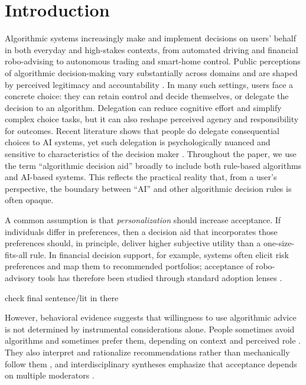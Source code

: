 \documentclass[a4paper, 12pt, fleqn]{article}
\theoremstyle{definition}
\begin{document}
\section{Introduction}\label{sec:intro}
Algorithmic systems increasingly make and implement decisions on users’ behalf in both everyday and high-stakes contexts, from automated driving and financial robo-advising to autonomous trading and smart-home control. Public perceptions of algorithmic decision-making vary substantially across domains and are shaped by perceived legitimacy and accountability \citep{Aysolmaz2023}. In many such settings, users face a concrete choice: they can retain control and decide themselves, or delegate the decision to an algorithm. Delegation can reduce cognitive effort and simplify complex choice tasks, but it can also reshape perceived agency and responsibility for outcomes. Recent literature shows that people do delegate consequential choices to AI systems, yet such delegation is psychologically nuanced and sensitive to characteristics of the decision maker \citep{Candrian2022}. Throughout the paper, we use the term ``algorithmic decision aid'' broadly to include both rule-based algorithms and AI-based systems. This reflects the practical reality that, from a user's perspective, the boundary between ``AI'' and other algorithmic decision rules is often opaque.

A common assumption is that \emph{personalization} should increase acceptance. If individuals differ in preferences, then a decision aid that incorporates those preferences should, in principle, deliver higher subjective utility than a one-size-fits-all rule. In financial decision support, for example, systems often elicit risk preferences and map them to recommended portfolios; acceptance of robo-advisory tools has therefore been studied through standard adoption lenses \citep{Figa-Talamanca2022,Mahmud2025}.
\begin{icomm}
	 check final sentence/lit in there
\end{icomm}

However, behavioral evidence suggests that willingness to use algorithmic advice is not determined by instrumental considerations alone. People sometimes avoid algorithms and sometimes prefer them, depending on context and perceived role \citep{Dietvorst2018,Logg2019}. They also interpret and rationalize recommendations rather than mechanically follow them \citep{Yeomans2019}, and interdisciplinary syntheses emphasize that acceptance depends on multiple moderators \citep[including perceived control;][]{Mahmud2022,Chugunova2022}. 
\end{document}
